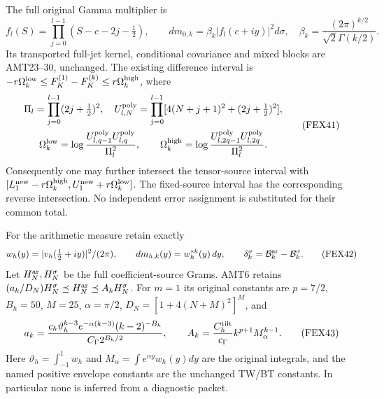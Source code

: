 \documentclass[11pt,a4paper]{article}
\begin{document}
The full original Gamma multiplier is
\[
 f_l(S)=\prod_{j=0}^{l-1}(S-c-2j-\tfrac12),\qquad
 dm_{0,k}=\beta_k|f_l(c+iy)|^2d\sigma,
 \quad \beta_k=\frac{(2\pi)^{k/2}}{\sqrt2\Gamma(k/2)}.
 \tag{FEX40}
\]
Its transported full-jet kernel, conditional covariance and mixed blocks
are AMT23--30, unchanged. The existing difference interval is
$-r\Omega_k^{\rm low}\le F_K^{(1)}-F_K^{(k)}\le r\Omega_k^{\rm high}$,
where
\[
\begin{gathered}
 \Pi_l=\prod_{j=0}^{l-1}(2j+\tfrac12)^2,\quad
 U_{l,N}^{\rm poly}=\prod_{j=0}^{l-1}
                  [4(N+j+1)^2+(2j+\tfrac12)^2],\\
 \Omega_k^{\rm low}=\log\frac{U_{l,q-1}^{\rm poly}U_{l,q}^{\rm poly}}{\Pi_l^2},
 \qquad
 \Omega_k^{\rm high}=\log\frac{U_{l,2q-1}^{\rm poly}U_{l,2q}^{\rm poly}}{\Pi_l^2}.
\end{gathered}\tag{FEX41}
\]
Consequently one may further intersect the tensor-source interval with
$[L_1^{\rm new}-r\Omega_k^{\rm high},
 U_1^{\rm new}+r\Omega_k^{\rm low}]$. The fixed-source interval has the
corresponding reverse intersection. No independent error assignment is
substituted for their common total.

For the arithmetic measure retain exactly
\[
 w_h(y)=|v_h(\tfrac12+iy)|^2/(2\pi),\qquad
 dm_{h,k}(y)=w_h^{*k}(y)\,dy,\qquad
 \delta_k^\sigma=\mathcal B_k^{\rm ar}-\mathcal B_k^\sigma.
 \tag{FEX42}
\]
Let $H_N^{\rm ar},H_N^\sigma$ be the full coefficient-source Grams.
AMT6 retains $(a_k/D_N)H_N^\sigma\preceq H_N^{\rm ar}\preceq A_kH_N^\sigma$.
For $m=1$ its original constants are $p=7/2$, $B_h=50$, $M=25$,
$\alpha=\pi/2$, $D_N=[1+4(N+M)^2]^M$, and
\[
 a_k=\frac{c_h\vartheta_h^{k-3}e^{-\alpha(k-3)}(k-2)^{-B_h}}
                  {C_\Gamma2^{B_h/2}},\qquad
 A_k=\frac{C_h^{\rm tilt}}{c_\Gamma}k^{p+1}M_\alpha^{k-1}.
 \tag{FEX43}
\]
Here $\vartheta_h=\int_{-1}^1w_h$ and $M_\alpha=\int e^{\alpha y}w_h(y)dy$
are the original integrals, and the named positive envelope constants
are the unchanged TW/BT constants. In particular none is inferred from
a diagnostic packet.
\end{document}
